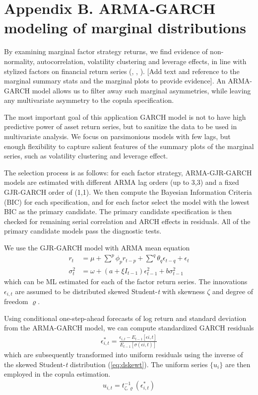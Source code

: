 \newpage
\section{Appendix B. ARMA-GARCH modeling of marginal distributions} \label{App:AppendixB}

By examining marginal factor strategy returns, we find evidence of non-normality, autocorrelation, volatility clustering and leverage effects, in line with stylized factors on financial return series (\textcite{Bollerslev1986}, \textcite{Black1976}, \textcite{glosten1993relation}). [Add text and reference to the marginal summary stats and the marginal plots to provide evidence]. An ARMA-GARCH model allows us to filter away such marginal asymmetries, while leaving any multivariate asymmetry to the copula specification. 

The most important goal of this application GARCH model is not to have high predictive power of asset return series, but to sanitize the data to be used in multivariate analysis. We focus on parsimonious models with few lags, but enough flexibility to capture salient features of the summary plots of the marginal series, such as volatility clustering and leverage effect.

The selection process is as follows: for each factor strategy, ARMA-GJR-GARCH models are estimated with different ARMA lag orders (up to 3,3) and a fixed GJR-GARCH order of (1,1). We then compute the Bayesian Information Criteria (BIC) for each specification, and for each factor select the model with the lowest BIC as the primary candidate. The primary candidate specification is then checked for remaining serial correlation and ARCH effects in residuals. All of the primary candidate models pass the diagnostic tests.

We use the GJR-GARCH model with ARMA mean equation
\begin{align}
    r_t &= \mu + \sum^p \phi_p r_{t-p} + \sum^q \theta_q \epsilon_{t-q} + \epsilon_{t}  \\
    \sigma_{t}^2 &= \omega + (a + \xi I_{t-1}) \epsilon_{t-1}^2 + b \sigma^2_{t-1}
\end{align}
which can be ML estimated for each of the factor return series. The innovations $\epsilon_{i,t}$ are assumed to be distributed skewed Student-\textit{t} with skewness $\zeta$ and degree of freedom $\varrho$.

Using conditional one-step-ahead forecasts of log return and standard deviation from the ARMA-GARCH model, we can compute standardized GARCH residuals
\begin{align}
    \epsilon^*_{i,t} = \frac{\epsilon_{i,t} - E_{t-1}[\epsilon{i,t}]}{E_{t-1}[\sigma(\epsilon{i,t})]}
\end{align}
which are subsequently transformed into uniform residuals using the inverse of the skewed Student-\textit{t} distribution (\autoref{eq:dskewt}). The uniform series $\{u_i\}$ are then employed in the copula estimation.
\begin{align}
    u_{i,t} = t^{-1}_{\zeta, \varrho}(\epsilon^*_{i,t})
\end{align}


